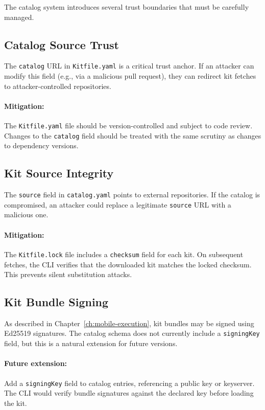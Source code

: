 The catalog system introduces several trust boundaries that must be carefully managed.

\subsection{Catalog Source Trust}

The \texttt{catalog} URL in \texttt{Kitfile.yaml} is a critical trust anchor. If an attacker can modify this field (e.g., via a malicious pull request), they can redirect kit fetches to attacker-controlled repositories.

\paragraph{Mitigation:} The \texttt{Kitfile.yaml} file should be version-controlled and subject to code review. Changes to the \texttt{catalog} field should be treated with the same scrutiny as changes to dependency versions.

\subsection{Kit Source Integrity}

The \texttt{source} field in \texttt{catalog.yaml} points to external repositories. If the catalog is compromised, an attacker could replace a legitimate \texttt{source} URL with a malicious one.

\paragraph{Mitigation:} The \texttt{Kitfile.lock} file includes a \texttt{checksum} field for each kit. On subsequent fetches, the CLI verifies that the downloaded kit matches the locked checksum. This prevents silent substitution attacks.

\subsection{Kit Bundle Signing}

As described in Chapter~\ref{ch:mobile-execution}, kit bundles may be signed using Ed25519 signatures. The catalog schema does not currently include a \texttt{signingKey} field, but this is a natural extension for future versions.

\paragraph{Future extension:} Add a \texttt{signingKey} field to catalog entries, referencing a public key or keyserver. The CLI would verify bundle signatures against the declared key before loading the kit.

